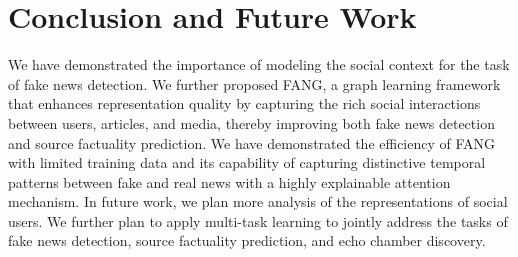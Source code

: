 \documentclass[sigconf]{acmart}
\theoremstyle{definition}
\theoremstyle{hypothesis}
\begin{document}
\section{Conclusion and Future Work}
We have demonstrated the importance of modeling the social context for the task of fake news detection. We further proposed FANG, a graph learning framework that enhances representation quality by capturing the rich social interactions between users, articles, and media, thereby improving both fake news detection and source factuality prediction. 
We have demonstrated the efficiency of FANG with limited training data and its capability of capturing distinctive temporal patterns between fake and real news with a highly explainable attention mechanism. 
In future work, we plan more analysis of the representations of social users. We further plan to apply multi-task learning 
to jointly address the tasks of fake news detection, source factuality prediction, and echo chamber discovery.






\appendix
\end{document}
